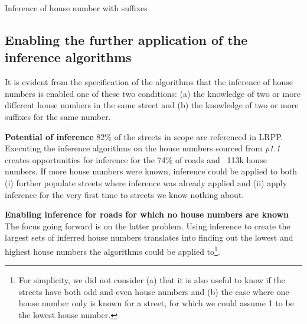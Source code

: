 \vspace{5mm}

\begin{algorithm}[H]
    \caption{Inference of house number with suffixes}
    \label{algo:inference-numbers-suffix}
\end{algorithm}

\subsection{Enabling the further application of the inference algorithms} 

It is evident from the specification of the algorithms that the inference of house numbers is enabled one of these two conditions: (a) the knowledge of two or more different house numbers in the same street and (b) the knowledge of two or more suffixes for the same number.

\textbf{Potential of inference} 82\% of the streets in scope are referenced in LRPP. Executing the inference algorithms on the house numbers sourced from {\it p1.1} creates opportunities for inference for the 74\% of roads and ~113k house numbers. If more house numbers were known, inference could be applied to both (i) further populate streets where inference was already applied and (ii) apply inference for the very first time to streets we know nothing about.

\begin{figure}[!ht]
    \begin{floatrow}
   \end{floatrow}
\end{figure}
        
\textbf{Enabling inference for roads for which no house numbers are known} The focus going forward is on the latter problem. Using inference to create the largest sets of inferred house numbers translates into finding out the lowest and highest house numbers the algorithms could be applied to\footnote{For simplicity, we did not consider (a) that it is also useful to know if the streets have both odd and even house numbers and (b) the case where one house number only is known for a street, for which we could assume 1 to be the lowest house number.}.

